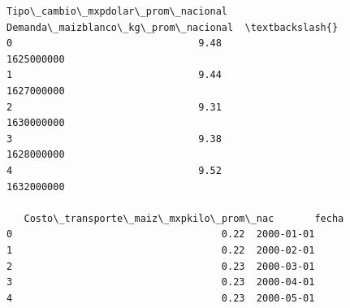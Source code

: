 \documentclass[11pt]{article}
\begin{document}
\begin{tcolorbox}[breakable, size=fbox, boxrule=.5pt, pad at break*=1mm, opacityfill=0]
\begin{Verbatim}[commandchars=\\\{\}]
   Tipo\_cambio\_mxpdolar\_prom\_nacional  Demanda\_maizblanco\_kg\_prom\_nacional  \textbackslash{}
0                                9.48                           1625000000
1                                9.44                           1627000000
2                                9.31                           1630000000
3                                9.38                           1628000000
4                                9.52                           1632000000

   Costo\_transporte\_maiz\_mxpkilo\_prom\_nac       fecha
0                                    0.22  2000-01-01
1                                    0.22  2000-02-01
2                                    0.23  2000-03-01
3                                    0.23  2000-04-01
4                                    0.23  2000-05-01
\end{Verbatim}
\end{tcolorbox}
        
\end{document}
